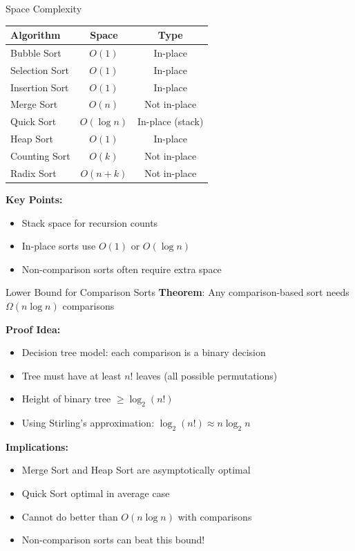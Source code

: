 \documentclass[aspectratio=169]{beamer}
\begin{document}
\begin{frame}{Space Complexity}
  \begin{center}
  \begin{tabular}{|l|c|c|}
    \hline
    \textbf{Algorithm} & \textbf{Space} & \textbf{Type} \\
    \hline
    Bubble Sort & $O(1)$ & In-place \\
    \hline
    Selection Sort & $O(1)$ & In-place \\
    \hline
    Insertion Sort & $O(1)$ & In-place \\
    \hline
    Merge Sort & $O(n)$ & Not in-place \\
    \hline
    Quick Sort & $O(\log n)$ & In-place (stack) \\
    \hline
    Heap Sort & $O(1)$ & In-place \\
    \hline
    Counting Sort & $O(k)$ & Not in-place \\
    \hline
    Radix Sort & $O(n + k)$ & Not in-place \\
    \hline
  \end{tabular}
  \end{center}

  \vspace{0.3cm}
  \textbf{Key Points:}
  \begin{itemize}
    \item Stack space for recursion counts
    \item In-place sorts use $O(1)$ or $O(\log n)$
    \item Non-comparison sorts often require extra space
  \end{itemize}
\end{frame}

\begin{frame}{Lower Bound for Comparison Sorts}
  \textbf{Theorem}: Any comparison-based sort needs $\Omega(n \log n)$ comparisons

  \vspace{0.3cm}
  \textbf{Proof Idea:}
  \begin{itemize}
    \item Decision tree model: each comparison is a binary decision
    \item Tree must have at least $n!$ leaves (all possible permutations)
    \item Height of binary tree $\geq \log_2(n!)$
    \item Using Stirling's approximation: $\log_2(n!) \approx n \log_2 n$
  \end{itemize}

  \vspace{0.3cm}
  \textbf{Implications:}
  \begin{itemize}
    \item Merge Sort and Heap Sort are asymptotically optimal
    \item Quick Sort optimal in average case
    \item Cannot do better than $O(n \log n)$ with comparisons
    \item Non-comparison sorts can beat this bound!
  \end{itemize}
\end{frame}
\end{document}
